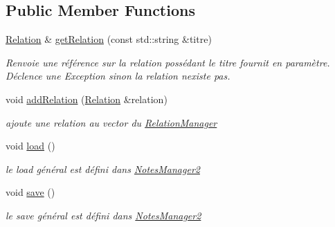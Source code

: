 \subsection*{Public Member Functions}
\begin{DoxyCompactItemize}
\item 
\hyperlink{class_relation}{Relation} \& \hyperlink{class_relation_manager_a7e5900e270c2249831355c70b2fd94b8}{get\+Relation} (const std\+::string \&titre)
\begin{DoxyCompactList}\small\item\em Renvoie une référence sur la relation possédant le titre fournit en paramètre. Déclence une Exception sinon la relation n\textquotesingle{}existe pas. \end{DoxyCompactList}\item 
void \hyperlink{class_relation_manager_a2933861a9b973a35031e799ef9d369b5}{add\+Relation} (\hyperlink{class_relation}{Relation} \&relation)
\begin{DoxyCompactList}\small\item\em ajoute une relation au vector du \hyperlink{class_relation_manager}{Relation\+Manager} \end{DoxyCompactList}\item 
\mbox{\label{class_relation_manager_a593a538680d22c21a8d1a8dd981f6b44}} 
void \hyperlink{class_relation_manager_a593a538680d22c21a8d1a8dd981f6b44}{load} ()
\begin{DoxyCompactList}\small\item\em le load général est défini dans \hyperlink{class_notes_manager2}{Notes\+Manager2} \end{DoxyCompactList}\item 
\mbox{\label{class_relation_manager_ac9b805487819264d8ef7faab68521822}} 
void \hyperlink{class_relation_manager_ac9b805487819264d8ef7faab68521822}{save} ()
\begin{DoxyCompactList}\small\item\em le save général est défini dans \hyperlink{class_notes_manager2}{Notes\+Manager2} \end{DoxyCompactList}\end{DoxyCompactItemize}
